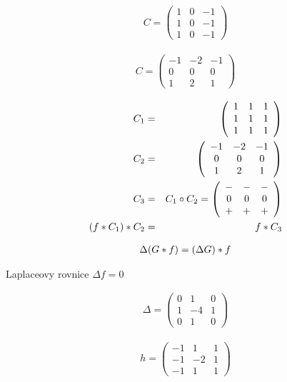 \begin{enumerate}
\begin{eqnarray}
C=\left(\begin{array}{ccc}1&0&-1\\1&0&-1\\1&0&-1\end{array}\right)
\end{eqnarray}



\begin{eqnarray}
C=\left(\begin{array}{ccc}-1&-2&-1\\0&0&0\\1&2&1\end{array}\right)
\end{eqnarray}


\begin{eqnarray}
C_1&=&\left(\begin{array}{ccc}1&1&1\\1&1&1\\1&1&1\end{array}\right)\\
C_2&=&\left(\begin{array}{ccc}-1&-2&-1\\0&0&0\\1&2&1\end{array}\right)\\
C_3&=&C_1\circ C_2=\left(\begin{array}{ccc}-&-&-\\0&0&0\\+&+&+\end{array}\right)\\
(f\ast C_1)\ast C_2&=&f\ast C_3
\end{eqnarray}



\begin{eqnarray}
\Delta (G\ast f)=(\Delta G)\ast f
\end{eqnarray}

Laplaceovy rovnice $\Delta f=0$

\begin{eqnarray}
\Delta =\left(\begin{array}{ccc}0&1&0\\1&-4&1\\0&1&0\end{array}\right)
\end{eqnarray}

\begin{eqnarray}
h =\left(\begin{array}{ccc}-1&1&1\\-1&-2&1\\-1&1&1\end{array}\right)
\end{eqnarray}


\end{enumerate}
